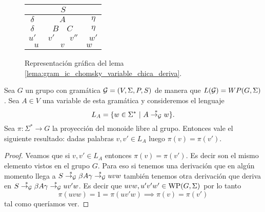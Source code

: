 \documentclass[tesis.tex]{subfiles}
\begin{document}
	
	\begin{figure}
		\begin{center}
			\begin{adjustbox}{width = 0.55\textwidth}
				\begin{tabular}{|c|c|c|c|c|c|}
					\hline 
					\multicolumn{6}{|c|}{$S$} \\
					\hline
					$\delta$ &  \multicolumn{4}{|c|}{$A$} & $\eta$ \\
					\hline 
					$\delta$ & \multicolumn{1}{|c}{} & \multicolumn{1}{c|}{$B$} & \multicolumn{1}{|c}{$C$} & \multicolumn{1}{c|}{} & $\eta$ \\
					\hline
					$u'$ & \multicolumn{2}{|c|}{$v'$} & \multicolumn{2}{|c|}{$v''$} & $w'$ \\
					\hline 
					\multicolumn{2}{|c|}{$u$} & \multicolumn{2}{|c|}{$v$} &  \multicolumn{2}{|c|}{$w$}\\
					\hline 
				\end{tabular}
			\end{adjustbox}
		\end{center}
		\caption{Representación gráfica del lema \ref*{lema:gram_ic_chomsky_variable_chica_deriva}.}
	\end{figure}

\begin{lema}\label{palabras-wp}
	Sea $G$ un grupo \ic con gramática ${\cal G} = (V, \Sigma, P, S)$ de manera que $L({\cal G}) = WP(G,\Sigma)$.
	Sea $A \in V$ una variable de esta gramática y consideremos el lenguaje
	\[
	L_A = \{ w \in \Sigma^*  \ | \ A \overset{*}{\to_{\cal G}} w  \}.
	\]
	Sea $\pi:\Sigma^* \to G$ la proyección del monoide libre al grupo.
	Entonces vale el siguiente resultado:
	dadas palabras $v,v' \in L_{A}$ luego $\pi(v) = \pi(v')$.
\end{lema}

\begin{proof}
	Veamos que si $v,v' \in L_A$ entonces $\pi(v){=} \pi(v')$. 
	Es decir son el mismo elemento vistos en el grupo $G$. 
	Para eso si tenemos una derivación que en algún momento llega a $S \overset{*}{\to_{\cal G}} \beta A \gamma \overset{*}{\to_{\cal G}} uvw$ también tenemos otra derivación que deriva en $S \overset{*}{\to_{\cal G}} \beta A \gamma  \overset{*}{\to_{\cal G}} uv'w$. 
	Es decir que $uvw, u'v'w' \in \text{WP}(G, \Sigma)$ por lo tanto 
	\begin{equation*}
		\pi(uvw) = 1 = \pi(uv'w) \implies \pi(v) = \pi( v')
	\end{equation*}
	tal como queríamos ver.
\end{proof}
\end{document}
